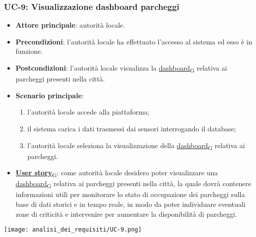 \subsubsection{UC-9: Visualizzazione dashboard parcheggi}
\begin{itemize}
	\item \textbf{Attore principale}: autorità locale.
	\item \textbf{Precondizioni}: l'autorità locale ha effettuato l'accesso al sistema ed esso è in funzione.
	\item \textbf{Postcondizioni}: l'autorità locale visualizza la \href{https://7last.github.io/docs/pb/documentazione-interna/glossario\#dashboard}{dashboard\textsubscript{G}} relativa
	      ai parcheggi presenti nella città.
	\item \textbf{Scenario principale}:
	      \begin{enumerate}
		      \item l'autorità locale accede alla piattaforma;
		      \item il sistema carica i dati trasmessi dai sensori interrogando il database;
		      \item l'autorità locale seleziona la visualizzazione della \href{https://7last.github.io/docs/pb/documentazione-interna/glossario\#dashboard}{dashboard\textsubscript{G}} relativa ai parcheggi.
	      \end{enumerate}
	\item \href{https://7last.github.io/docs/pb/documentazione-interna/glossario\#user-story}{\textbf{User story}\textsubscript{G}}:
	      come autorità locale desidero poter visualizzare una \href{https://7last.github.io/docs/pb/documentazione-interna/glossario\#dashboard}{dashboard\textsubscript{G}} relativa ai parcheggi presenti nella città, la quale
	      dovrà contenere informazioni utili per monitorare lo stato di occupazione dei parcheggi sulla base di dati storici e in tempo reale,
	      in modo da poter individuare eventuali zone di criticità e intervenire per aumentare la disponibilità di parcheggi.
\end{itemize}
\begin{center}
	\texttt{[image: analisi\_dei\_requisiti/UC-9.png]}
\end{center}


